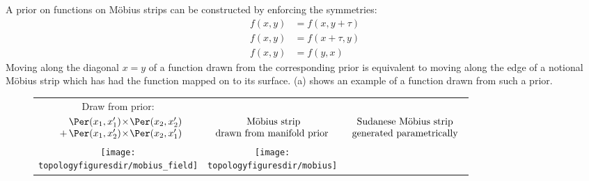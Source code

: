 A prior on functions on M\"{o}bius strips can be constructed by enforcing the symmetries:
%
\begin{align}
f(x, y) & = f( x, y + \tau) \\
f(x, y) & = f( x + \tau, y)  \\
f(x, y) & = f( y, x )
\end{align}
%
Moving along the diagonal $x = y$ of a function drawn from the corresponding \gp{} prior is equivalent to moving along the edge of a notional M\"{o}bius strip which has had the function mapped on to its surface.
(a) shows an example of a function drawn from such a prior.
%
\begin{figure}
\begin{tabular}[t]{ccc}
\centering
Draw from \gp{} prior: &  &  \\
$\begin{array}{l@{}l@{}}
&\Per(x_1, x_1') \kerntimes \Per(x_2, x_2') \\
          \kernplus & \Per(x_1, x_2') \kerntimes \Per(x_2, x_1')
\end{array}$
& $\begin{array}{c} \textnormal{ M\"{o}bius strip}  \\ \textnormal{drawn from manifold prior}  \end{array}$
 & $\begin{array}{c} \textnormal{Sudanese M\"{o}bius strip}  \\ \textnormal{generated parametrically}  \end{array}$\\
\texttt{[image: \\topologyfiguresdir/mobius\_field]} & 
\texttt{[image: \\topologyfiguresdir/mobius]} &

\end{tabular}
\end{figure}
